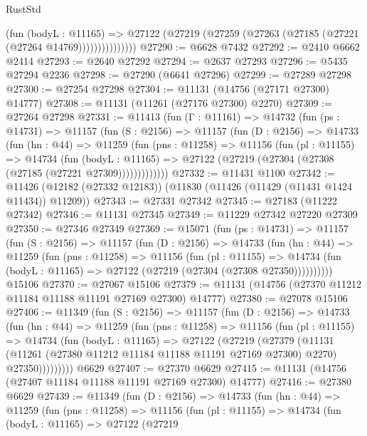 \begin{lexlean}{RustStd}
\begin{coremodule}
                    (fun (bodyL : @11165) =>
                    @27122 (@27219 (@27259 (@27263 (@27185 (@27221 (@27264 @14769)))))))))))))))
@27290 := @6628 @7432
@27292 := @2410 @6662 @2414
@27293 := @2640 @27292
@27294 := @2637 @27293
@27296 := @5435 @27294 @2236
@27298 := @27290 (@6641 @27296)
@27299 := @27289 @27298
@27300 := @27254 @27298
@27304 := @11131 (@14756 (@27171 @27300) @14777)
@27308 := @11131 (@11261 (@27176 @27300) @2270)
@27309 := @27264 @27298
@27331 := @11413
    (fun (Γ : @11161) =>
    @14732
      (fun (ps : @14731) =>
      @11157
        (fun (S : @2156) =>
        @11157
          (fun (D : @2156) =>
          @14733
            (fun (hn : @44) =>
            @11259
              (fun (pns : @11258) =>
              @11156
                (fun (pl : @11155) =>
                @14734
                  (fun (bodyL : @11165) =>
                  @27122 (@27219 (@27304 (@27308 (@27185 (@27221 @27309)))))))))))))
@27332 := @11431 @1100
@27342 := @11426 (@12182 (@27332 @12183)) (@11830 (@11426 (@11429 (@11431 @1424 @11434)) @11209))
@27343 := @27331 @27342
@27345 := @27183 (@11222 @27342)
@27346 := @11131 @27345
@27349 := @11229 @27342 @27220 @27309
@27350 := @27346 @27349
@27369 := @15071
    (fun (ps : @14731) =>
    @11157
      (fun (S : @2156) =>
      @11157
        (fun (D : @2156) =>
        @14733
          (fun (hn : @44) =>
          @11259
            (fun (pns : @11258) =>
            @11156
              (fun (pl : @11155) =>
              @14734 (fun (bodyL : @11165) => @27122 (@27219 (@27304 (@27308 @27350))))))))))
    @15106
@27370 := @27067 @15106
@27379 := @11131 (@14756 (@27370 @11212 @11184 @11188 @11191 @27169 @27300) @14777)
@27380 := @27078 @15106
@27406 := @11349
    (fun (S : @2156) =>
    @11157
      (fun (D : @2156) =>
      @14733
        (fun (hn : @44) =>
        @11259
          (fun (pns : @11258) =>
          @11156
            (fun (pl : @11155) =>
            @14734
              (fun (bodyL : @11165) =>
              @27122
                (@27219
                  (@27379
                    (@11131
                      (@11261 (@27380 @11212 @11184 @11188 @11191 @27169 @27300) @2270)
                      @27350)))))))))
    @6629
@27407 := @27370 @6629
@27415 := @11131 (@14756 (@27407 @11184 @11188 @11191 @27169 @27300) @14777)
@27416 := @27380 @6629
@27439 := @11349
    (fun (D : @2156) =>
    @14733
      (fun (hn : @44) =>
      @11259
        (fun (pns : @11258) =>
        @11156
          (fun (pl : @11155) =>
          @14734
            (fun (bodyL : @11165) =>
            @27122
              (@27219

\end{coremodule}
\end{lexlean}
